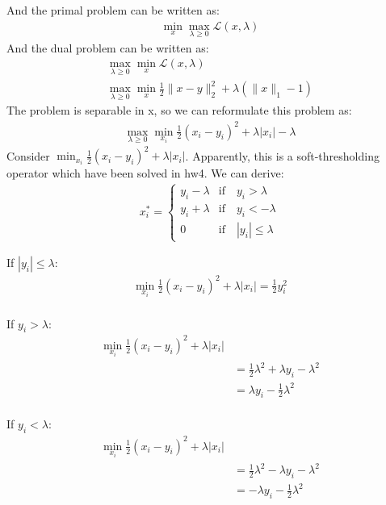 \documentclass[12pt]{article}
\begin{document}
And the primal problem can be written as:
\begin{align*}
    \min_{x} \max_{\lambda \geq 0} \mathcal{L}(x, \lambda)
\end{align*}
And the dual problem can be written as:
\begin{align*}
    \max_{\lambda \geq 0} \min_{x} \mathcal{L}(x, \lambda) \\
    \max_{\lambda \geq 0} \min_{x} \frac{1}{2} \|x - y\|_2^2 + \lambda(\|x\|_1 - 1)
\end{align*}
The problem is separable in x, so we can reformulate this problem as:
\begin{align*}
    \max_{\lambda \geq 0} \min_{x_i} \frac{1}{2} (x_i - y_i)^2 + \lambda|x_i| - \lambda
\end{align*}
Consider \(\min_{x_i} \frac{1}{2} (x_i - y_i)^2 + \lambda|x_i|\).
Apparently, this is a soft-thresholding operator which have been solved in hw4. We can derive:
\begin{align*}
    x_i^* = \begin{cases}
        y_i - \lambda &\text{if}\quad y_i > \lambda \\
        y_i + \lambda &\text{if}\quad y_i < -\lambda \\
        0             &\text{if}\quad |y_i| \leq \lambda
    \end{cases}
\end{align*}

If \(|y_i| \leq \lambda\):
\begin{align*}
    \min_{x_i} \frac{1}{2} (x_i - y_i)^2 + \lambda|x_i| = \frac{1}{2} y_i^2 \\
\end{align*}

If \(y_i > \lambda\):
\begin{align*}
    \min_{x_i} \frac{1}{2} (x_i - y_i)^2 + \lambda|x_i|&\\
    &= \frac{1}{2} \lambda^2 + \lambda y_i - \lambda^2  \\
    &= \lambda y_i - \frac{1}{2} \lambda^2\\
\end{align*}


If \(y_i < \lambda\):
\begin{align*}
    \min_{x_i} \frac{1}{2} (x_i - y_i)^2 + \lambda|x_i|&\\
    &= \frac{1}{2} \lambda^2 - \lambda y_i - \lambda^2  \\
    &= -\lambda y_i - \frac{1}{2} \lambda^2\\
\end{align*}
\end{document}
